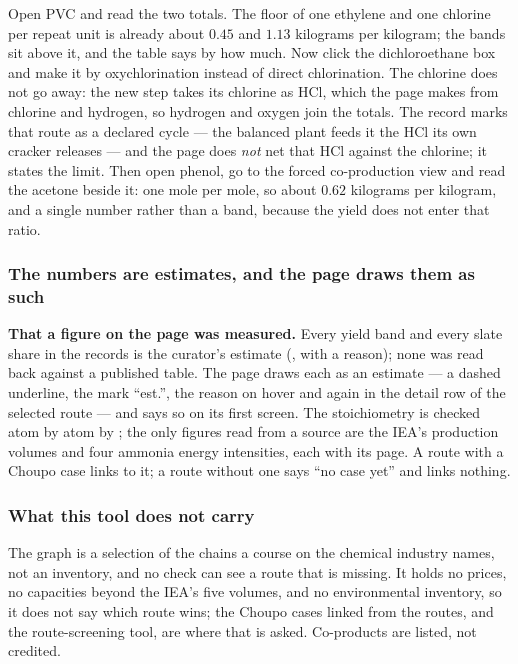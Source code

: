 \documentclass[11pt,a4paper]{article}
\begin{document}
\begin{tryit}
Open PVC and read the two totals.  The floor of one ethylene and one
chlorine per repeat unit is already about $0.45$ and $1.13$ kilograms per
kilogram; the bands sit above it, and the table says by how much.  Now click
the dichloroethane box and make it by oxychlorination instead of direct
chlorination.  The chlorine does not go away: the new step takes its
chlorine as HCl, which the page makes from chlorine and hydrogen, so
hydrogen and oxygen join the totals.  The record marks that route as a
declared cycle --- the balanced plant feeds it the HCl its own cracker
releases --- and the page does \emph{not} net that HCl against the
chlorine; it states the limit.  Then open phenol, go to the forced
co-production view and read the acetone beside it: one mole per mole, so
about $0.62$ kilograms per kilogram, and a single number rather than a
band, because the yield does not enter that ratio.
\end{tryit}

\subsubsection*{The numbers are estimates, and the page draws them as such}

\begin{pitfall}
\textbf{That a figure on the page was measured.}  Every yield band and
every slate share in the records is the curator's estimate
(, with a reason); none was read back against a
published table.  The page draws each as an estimate --- a dashed underline,
the mark ``est.'', the reason on hover and again in the detail row of the
selected route --- and says so on its first screen.  The stoichiometry is
checked atom by atom by ; the only
figures read from a source are the IEA's production volumes and four
ammonia energy intensities, each with its page.  A route with a Choupo case
links to it; a route without one says ``no case yet'' and links nothing.
\end{pitfall}

\subsubsection*{What this tool does not carry}

The graph is a selection of the chains a course on the chemical industry
names, not an inventory, and no check can see a route that is missing.  It
holds no prices, no capacities beyond the IEA's five volumes, and no
environmental inventory, so it does not say which route wins; the Choupo
cases linked from the routes, and the route-screening tool, are where that
is asked.  Co-products are listed, not credited.
\end{document}
